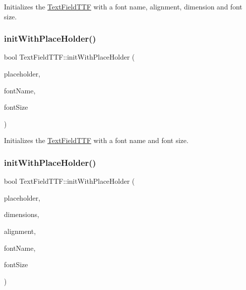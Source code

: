 Initializes the \hyperlink{classTextFieldTTF}{Text\+Field\+T\+TF} with a font name, alignment, dimension and font size. \mbox{\label{classTextFieldTTF_a03e5755fca447d202d9bd4268a407fac}} 
\subsubsection{\texorpdfstring{init\+With\+Place\+Holder()}{initWithPlaceHolder()}\hspace{0.1cm}{\footnotesize\ttfamily [2/4]}}
{\footnotesize\ttfamily bool Text\+Field\+T\+T\+F\+::init\+With\+Place\+Holder (\begin{DoxyParamCaption}\item[{const std\+::string \&}]{placeholder,  }\item[{const std\+::string \&}]{font\+Name,  }\item[{float}]{font\+Size }\end{DoxyParamCaption})}

Initializes the \hyperlink{classTextFieldTTF}{Text\+Field\+T\+TF} with a font name and font size. \mbox{\label{classTextFieldTTF_aec3f818b7717c3355b98f6c9bd4bcc3f}} 
\subsubsection{\texorpdfstring{init\+With\+Place\+Holder()}{initWithPlaceHolder()}\hspace{0.1cm}{\footnotesize\ttfamily [3/4]}}
{\footnotesize\ttfamily bool Text\+Field\+T\+T\+F\+::init\+With\+Place\+Holder (\begin{DoxyParamCaption}\item[{const std\+::string \&}]{placeholder,  }\item[{const \hyperlink{classSize}{Size} \&}]{dimensions,  }\item[{Text\+H\+Alignment}]{alignment,  }\item[{const std\+::string \&}]{font\+Name,  }\item[{float}]{font\+Size }\end{DoxyParamCaption})}

